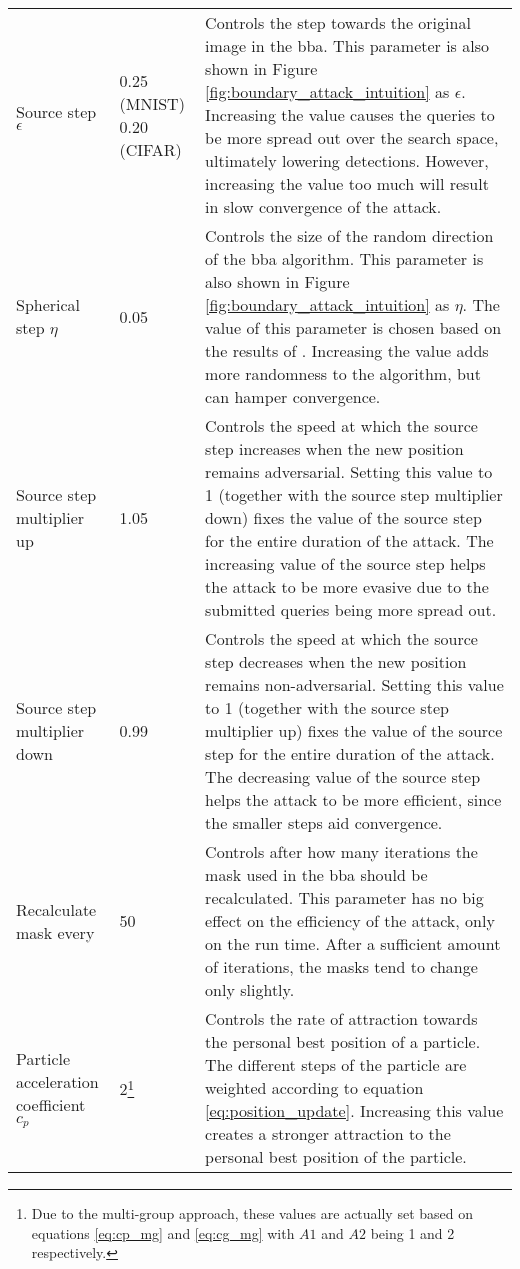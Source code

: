 \begin{longtable}{p{3cm}p{2.5cm}p{7cm}}
Source step $\epsilon$ &0.25 (MNIST) 0.20 (CIFAR) & Controls the step towards the original image in the \gls{bba}. This parameter is also shown in Figure \ref{fig:boundary_attack_intuition} as $\epsilon$. Increasing the value causes the queries to be more spread out over the search space, ultimately lowering detections. However, increasing the value too much will result in slow convergence of the attack.\\
Spherical step $\eta$	&0.05 & Controls the size of the random direction of the \gls{bba} algorithm. This parameter is also shown in Figure \ref{fig:boundary_attack_intuition} as $\eta$. The value of this parameter is chosen based on the results of \cite{brunner_guessing_2019}. Increasing the value adds more randomness to the algorithm, but can hamper convergence.\\
Source step multiplier up &1.05	&Controls the speed at which the source step increases when the new position remains adversarial. Setting this value to 1 (together with the source step multiplier down) fixes the value of the source step for the entire duration of the attack. The increasing value of the source step helps the attack to be more evasive due to the submitted queries being more spread out.\\
Source step multiplier down &0.99 &Controls the speed at which the source step decreases when the new position remains non-adversarial. Setting this value to 1 (together with the source step multiplier up) fixes the value of the source step for the entire duration of the attack. The decreasing value of the source step helps the attack to be more efficient, since the smaller steps aid convergence.\\
Recalculate mask every &50	&Controls after how many iterations the mask used in the \gls{bba} should be recalculated. This parameter has no big effect on the efficiency of the attack, only on the run time. After a sufficient amount of iterations, the masks tend to change only slightly.\\
Particle acceleration coefficient $c_p$ &2\footnote{\label{ftn:cp} Due to the multi-group approach, these values are actually set based on equations \ref{eq:cp_mg} and \ref{eq:cg_mg} with $A1$ and $A2$ being 1 and 2 respectively.} &Controls the rate of attraction towards the personal best position of a particle. The different steps of the particle are weighted according to equation \ref{eq:position_update}. Increasing this value creates a stronger attraction to the personal best position of the particle.\\

\end{longtable}
